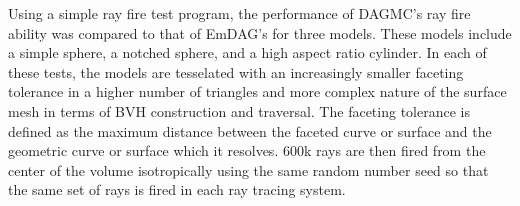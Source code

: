 \documentclass[10pt, a4paper]{article}
\begin{document}
Using a simple ray fire test program, the performance of DAGMC's ray fire ability was compared to that of EmDAG's for three models. These models include a simple sphere, a notched sphere, and a high aspect ratio cylinder. In each of these tests, the models are tesselated with an increasingly smaller faceting tolerance in a higher number of triangles and more complex nature of the surface mesh in terms of BVH construction and traversal. The faceting tolerance is defined as the maximum distance between the faceted curve or surface and the geometric curve or surface which it resolves. 600k rays are then fired from the center of the volume isotropically using the same random number seed so that the same set of rays is fired in each ray tracing system.

\begin{figure}

  \begin{center}
    

\end{center}
\end{figure}
\end{document}
